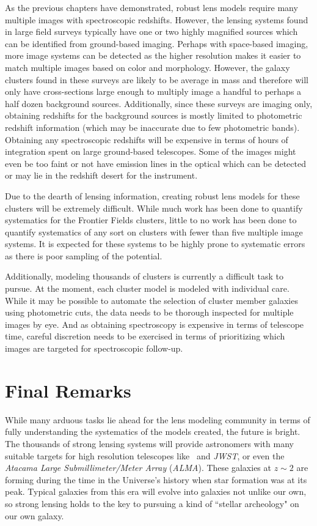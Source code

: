 As the previous chapters have demonstrated, robust lens models require many multiple images with spectroscopic redshifts. However, the lensing systems found in large field surveys typically have one or two highly magnified sources which can be identified from ground-based imaging. Perhaps with space-based imaging, more image systems can be detected as the higher resolution makes it easier to match multiple images based on color and morphology. However, the galaxy clusters found in these surveys are likely to be average in mass and therefore will only have cross-sections large enough to multiply image a handful to perhaps a half dozen background sources. Additionally, since these surveys are imaging only, obtaining redshifts for the background sources is mostly limited to photometric redshift information (which may be inaccurate due to few photometric bands). Obtaining any spectroscopic redshifts will be expensive in terms of hours of integration spent on large ground-based telescopes. Some of the images might even be too faint or not have emission lines in the optical which can be detected or may lie in the redshift desert for the instrument.

Due to the dearth of lensing information, creating robust lens models for these clusters will be extremely difficult. While much work has been done to quantify systematics for the Frontier Fields clusters, little to no work has been done to quantify systematics of any sort on clusters with fewer than five multiple image systems. It is expected for these systems to be highly prone to systematic errors as there is poor sampling of the potential.

Additionally, modeling thousands of clusters is currently a difficult task to pursue. At the moment, each cluster model is modeled with individual care. While it may be possible to automate the selection of cluster member galaxies using photometric cuts, the data needs to be thorough inspected for multiple images by eye. And as obtaining spectroscopy is expensive in terms of telescope time, careful discretion needs to be exercised in terms of prioritizing which images are targeted for spectroscopic follow-up.

\section{Final Remarks}

While many arduous tasks lie ahead for the lens modeling community in terms of fully understanding the systematics of the models created, the future is bright. The thousands of strong lensing systems will provide astronomers with many suitable targets for high resolution telescopes like \hst\ and {\it JWST}, or even the {\it Atacama Large Submillimeter/Meter Array} ({\it ALMA}). These galaxies at $z\sim2$ are forming during the time in the Universe's history when star formation was at its peak. Typical galaxies from this era will evolve into galaxies not unlike our own, so strong lensing holds to the key to pursuing a kind of ``stellar archeology" on our own galaxy.

